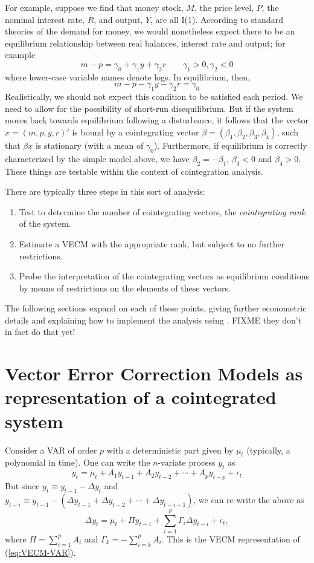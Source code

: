 For example, suppose we find that money stock, $M$, the price level,
$P$, the nominal interest rate, $R$, and output, $Y$, are all I(1).
According to standard theories of the demand for money, we would
nonetheless expect there to be an equilibrium relationship between
real balances, interest rate and output; for example
\[
m - p = \gamma_0 + \gamma_1 y + \gamma_2 r \qquad \gamma_1 > 0,
\gamma_2 < 0
\]
where lower-case variable names denote logs.  In equilibrium, then,
\[
m - p - \gamma_1 y - \gamma_2 r = \gamma_0
\]
Realistically, we should not expect this condition to be satisfied
each period.  We need to allow for the possibility of short-run
disequilibrium.  But if the system moves back towards equilibrium
following a disturbance, it follows that the vector $x = (m, p, y,
r)'$ is bound by a cointegrating vector $\beta = (\beta_1, \beta_2,
\beta_3, \beta_4)$, such that $\beta x$ is stationary (with a mean of
$\gamma_0$).  Furthermore, if equilibrium is correctly characterized
by the simple model above, we have $\beta_2 = -\beta_1$, $\beta_3 < 0$
and $\beta_4 > 0$.  These things are testable within the context of
cointegration analysis.

There are typically three steps in this sort of analysis:
\begin{enumerate}
\item Test to determine the number of cointegrating vectors, the 
  \emph{cointegrating rank} of the system.
\item Estimate a VECM with the appropriate rank, but subject to no
  further restrictions.
\item Probe the interpretation of the cointegrating vectors as
  equilibrium conditions by means of restrictions on the elements
  of these vectors.
\end{enumerate}

The following sections expand on each of these points, giving further
econometric details and explaining how to implement the analysis using
.  FIXME they don't in fact do that yet!


\section{Vector Error Correction Models as representation of a
  cointegrated system}
\label{sec:VECM-rep}

Consider a VAR of order $p$ with a deterministic part given by $\mu_t$
(typically, a polynomial in time). One can write the $n$-variate
process $y_t$ as
\begin{equation}
  \label{eq:VECM-VAR}
  y_t = \mu_t + A_1 y_{t-1} + A_2 y_{t-2} + \cdots + A_p y_{t-p} +
  \epsilon_t 
\end{equation}
But since $y_t \equiv y_{t-1} - \Delta y_t$ and $y_{t-i} \equiv
y_{t-1} - (\Delta y_{t-1} + \Delta y_{t-2} + \cdots + \Delta
y_{t-i+1})$, we can re-write the above as
\begin{equation}
  \label{eq:VECM}
  \Delta y_t = \mu_t + \Pi y_{t-1} + \sum_{i=1}^p \Gamma_i \Delta
  y_{t-i} + \epsilon_t ,
\end{equation}
where $\Pi = \sum_{i=1}^p A_i$ and $\Gamma_k = -\sum_{i=k}^p A_i$.
This is the VECM representation of (\ref{eq:VECM-VAR}).

